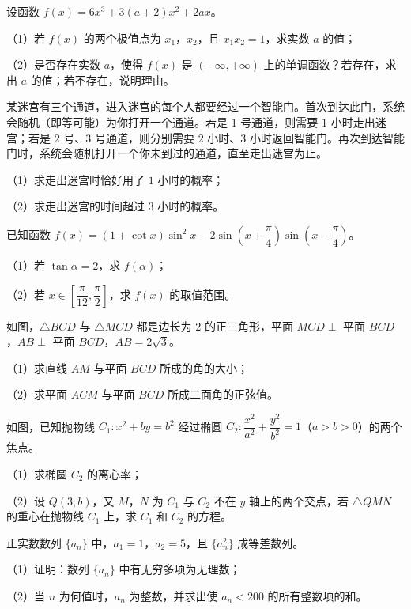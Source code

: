 \begin{question}
设函数 $f(x)=6x^3+3(a+2)x^2+2ax$。

（1）若 $f(x)$ 的两个极值点为 $x_1$，$x_2$，且 $x_1x_2=1$，求实数 $a$ 的值；

（2）是否存在实数 $a$，使得 $f(x)$ 是 $(-\infty,+\infty)$ 上的单调函数？若存在，求出 $a$ 的值；若不存在，说明理由。

\end{question}
\begin{question}
某迷宫有三个通道，进入迷宫的每个人都要经过一个智能门。首次到达此门，系统会随机（即等可能）为你打开一个通道。若是 $1$ 号通道，则需要 $1$ 小时走出迷宫；若是 $2$ 号、$3$ 号通道，则分别需要 $2$ 小时、$3$ 小时返回智能门。再次到达智能门时，系统会随机打开一个你未到过的通道，直至走出迷宫为止。

（1）求走出迷宫时恰好用了 $1$ 小时的概率；

（2）求走出迷宫的时间超过 $3$ 小时的概率。

\end{question}
\begin{question}
已知函数 $f(x)=(1+\cot x)\sin^2x-2\sin\left(x+\dfrac\pi4\right)\sin\left(x-\dfrac\pi4\right)$。

（1）若 $\tan\alpha=2$，求 $f(\alpha)$；

（2）若 $x\in\left[\dfrac\pi{12},\dfrac\pi2\right]$，求 $f(x)$ 的取值范围。

\Needspace{0.4\textheight}
\end{question}
\begingroup
\renewenvironment{question}{\Needspace{0.5\textheight}}{}
\begin{question}
如图，$\triangle BCD$ 与 $\triangle MCD$ 都是边长为 $2$ 的正三角形，平面 $MCD\perp$ 平面 $BCD$，$AB\perp$ 平面 $BCD$，$AB=2\sqrt3$。

（1）求直线 $AM$ 与平面 $BCD$ 所成的角的大小；

（2）求平面 $ACM$ 与平面 $BCD$ 所成二面角的正弦值。
\nopagebreak[4]
\begin{center}\end{center}
\nopagebreak[4]
\Needspace{0.4\textheight}
\end{question}
\endgroup
\begingroup
\renewenvironment{question}{\Needspace{0.5\textheight}}{}
\begin{question}
如图，已知抛物线 $C_1:x^2+by=b^2$ 经过椭圆 $C_2:\dfrac{x^2}{a^2}+\dfrac{y^2}{b^2}=1$（$a>b>0$）的两个焦点。

（1）求椭圆 $C_2$ 的离心率；

（2）设 $Q(3,b)$，又 $M$，$N$ 为 $C_1$ 与 $C_2$ 不在 $y$ 轴上的两个交点，若 $\triangle QMN$ 的重心在抛物线 $C_1$ 上，求 $C_1$ 和 $C_2$ 的方程。
\nopagebreak[4]
\begin{center}\end{center}
\nopagebreak[4]
\end{question}
\endgroup
\begin{question}
正实数数列 $\{a_n\}$ 中，$a_1=1$，$a_2=5$，且 $\{a_n^2\}$ 成等差数列。

（1）证明：数列 $\{a_n\}$ 中有无穷多项为无理数；

（2）当 $n$ 为何值时，$a_n$ 为整数，并求出使 $a_n<200$ 的所有整数项的和。

\end{question}